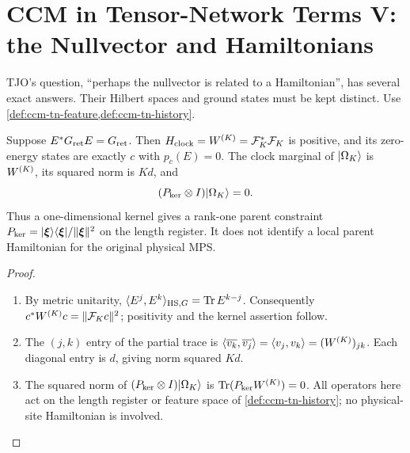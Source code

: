 
\section{CCM in Tensor-Network Terms V: the Nullvector and Hamiltonians}
\label{sec:ccm-tn-hamiltonians}

TJO's question, ``perhaps the nullvector is related to a Hamiltonian'',
has several exact answers. Their Hilbert spaces and ground states must
be kept distinct. Use \cref{def:ccm-tn-feature,def:ccm-tn-history}.

\begin{proposition}
\label{prop:ccm-tn-clock-hamiltonian}
Suppose $E^*G_{\mathrm{ret}} E=G_{\mathrm{ret}}$. Then
$H_{\mathrm{clock}}=W^{(K)}=\mathcal F_K^*\mathcal F_K$ is positive,
and its zero-energy states are exactly $c$ with $p_c(E)=0$.
The clock marginal of $|\Omega_K\rangle$ is $W^{(K)}$, its squared norm is
$Kd$, and
\[
 (P_{\ker}\otimes I)|\Omega_K\rangle=0.
\]
Thus a one-dimensional kernel gives a rank-one parent constraint
$P_{\ker}=|\boldsymbol{\xi}\rangle\langle\boldsymbol{\xi}|/\|\boldsymbol{\xi}\|^2$ on the length register.
It does not identify a local parent Hamiltonian for the original
physical MPS.
\end{proposition}
\begin{proof}
\begin{enumerate}
\item[$\langle1\rangle$1.] By metric unitarity,
$\langle E^j,E^k\rangle_{\mathrm{HS},G}=\operatorname{Tr} E^{k-j}$.
Consequently $c^*W^{(K)} c=\|\mathcal F_K c\|^2$; positivity and the
kernel assertion follow.
\item[$\langle1\rangle$2.] The $(j,k)$ entry of the partial trace is
$\langle\overline{v_k},\overline{v_j}\rangle
=\langle v_j,v_k\rangle=(W^{(K)})_{jk}$. Each diagonal entry is
$d$, giving norm squared $Kd$.
\item[$\langle1\rangle$3.] The squared norm of
$(P_{\ker}\otimes I)|\Omega_K\rangle$ is $\operatorname{Tr}(P_{\ker}W^{(K)})=0$.
All operators here act on the length register or feature space of
\cref{def:ccm-tn-history}; no physical-site Hamiltonian is involved.
\end{enumerate}
\end{proof}

